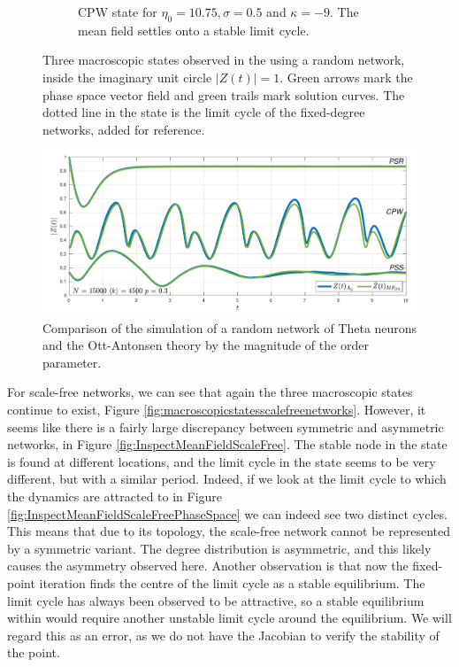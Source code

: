 \begin{figure}[H]
\begin{subfigure}[b]{0.32\linewidth}
   \caption{CPW state for $\eta_0 = 10.75, \sigma = 0.5$ and $\kappa= -9$. The mean field settles onto a stable limit cycle.}
   \label{fig:MFOARCPW_random}
\end{subfigure}
   \caption{Three macroscopic states observed in the \MFR using a random network, inside the imaginary unit circle $|Z(t)| = 1$. Green arrows mark the phase space vector field and green trails mark solution curves. The dotted line in the \CPW state is the limit cycle of the fixed-degree networks, added for reference.}
   \label{fig:macroscopicstatesrandomnetworks}
\end{figure}

\begin{figure}[H]
\centering
\includegraphics[width = \textwidth, trim={0 3mm 0 3mm},clip]{../Figures/InspectMeanFieldRandom.pdf}
\caption{Comparison of the simulation of a random network of Theta neurons and the Ott-Antonsen theory by the magnitude of the order parameter. }
\label{fig:InspectMeanFieldRandom}
\end{figure}

For scale-free networks, we can see that again the three macroscopic states continue to exist, Figure \ref{fig:macroscopicstatesscalefreenetworks}. However, it seems like there is a fairly large discrepancy between symmetric and asymmetric networks, in Figure \ref{fig:InspectMeanFieldScaleFree}. The stable node in the \PSR state is found at different locations, and the limit cycle in the \CPW state seems to be very different, but with a similar period. Indeed, if we look at the limit cycle to which the dynamics are attracted to in Figure \ref{fig:InspectMeanFieldScaleFreePhaseSpace} we can indeed see two distinct cycles. \\

This means that due to its topology, the scale-free network cannot be represented by a symmetric variant. The degree distribution is asymmetric, and this likely causes the asymmetry observed here. Another observation is that now the fixed-point iteration finds the centre of the limit cycle as a stable equilibrium. The limit cycle has always been observed to be attractive, so a stable equilibrium within would require another unstable limit cycle around the equilibrium. We will regard this as an error, as we do not have the Jacobian to verify the stability of the point.

